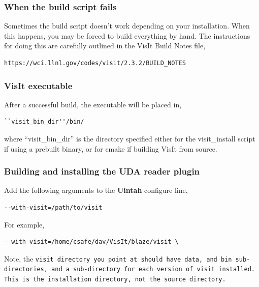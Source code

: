 \documentclass[12pt]{article}
\begin{document}
\subsubsection{When the build script fails}
\label{sec:WhenTheBuildsSriptFails}

Sometimes the build script doesn't work depending on your
installation. When this happens, you may be forced to build everything
by hand. The instructions for doing this are carefully outlined in the
VisIt Build Notes file,

\begin{verbatim}
https://wci.llnl.gov/codes/visit/2.3.2/BUILD_NOTES
\end{verbatim}

\subsubsection{VisIt executable}
\label{sec:VisItExecutable}

After a successful build, the executable will be placed in,

\begin{verbatim}
``visit_bin_dir''/bin/
\end{verbatim}

where ``visit\_bin\_dir'' is the directory specified either for the
visit\_install script if using a prebuilt binary, or for cmake if
building VisIt from source.

\subsubsection{Building and installing the UDA reader plugin}
\label{sec:BuildingAndInstallingUDAPlugin}

Add the following arguments to the \textbf{Uintah} configure line,

\begin{verbatim}
--with-visit=/path/to/visit
\end{verbatim}

For example,

\begin{verbatim}
--with-visit=/home/csafe/dav/VisIt/blaze/visit \
\end{verbatim}

Note, the \tt visit \normalfont directory you point at should
have \tt data\normalfont , and \tt bin \normalfont sub-directories,
and a sub-directory for each version of visit installed.  This is the
installation directory, not the source directory.
\end{document}
